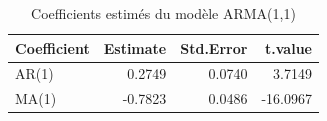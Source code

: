 \begin{table}[!h]
\centering
\caption{Coefficients estimés du modèle ARMA(1,1)}
\centering
\begin{tabular}[t]{lrrr}
\toprule
Coefficient & Estimate & Std.Error & t.value\\
\midrule
AR(1) & 0.2749 & 0.0740 & 3.7149\\
MA(1) & -0.7823 & 0.0486 & -16.0967\\
\bottomrule
\end{tabular}
\end{table}
